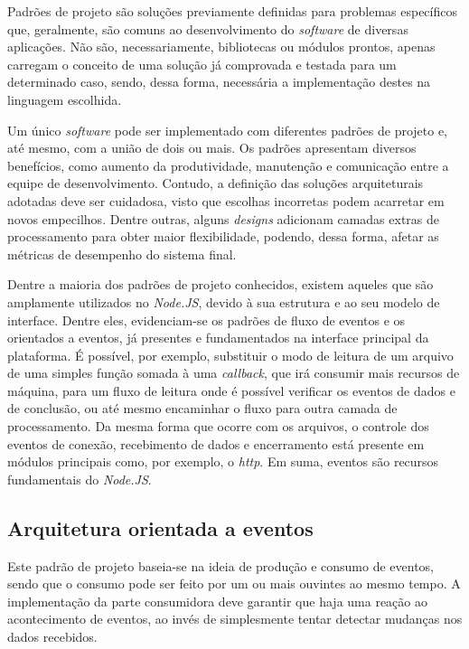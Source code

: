 \documentclass[12pt]{article}
\begin{document}
Padrões de projeto são soluções previamente definidas para problemas específicos que, geralmente,
são comuns ao desenvolvimento do \textit{software} de diversas aplicações. Não são, necessariamente, 
bibliotecas ou módulos prontos, apenas carregam o conceito de uma solução já comprovada e testada para um 
determinado caso, sendo, dessa forma, necessária a implementação destes na 
linguagem escolhida. \cite[p. 13]{DIOGORESENDE}

Um único \textit{software} pode ser implementado com diferentes padrões de projeto e, até mesmo, com a união
de dois ou mais. Os padrões apresentam diversos benefícios, como aumento da produtividade, manutenção e comunicação
entre a equipe de desenvolvimento. Contudo, a definição das soluções arquiteturais adotadas deve ser 
cuidadosa, visto que escolhas incorretas podem acarretar em novos empecilhos. Dentre outras, 
alguns \textit{designs} adicionam camadas extras de processamento para obter maior flexibilidade, podendo, dessa forma, 
afetar as métricas de desempenho do sistema final. \cite[p. 13 - p. 14]{DIOGORESENDE}

Dentre a maioria dos padrões de projeto conhecidos, existem aqueles que são amplamente utilizados no 
\textit{Node.JS}, devido à sua estrutura e ao seu modelo de interface. Dentre eles, evidenciam-se
os padrões de fluxo de eventos e os orientados a eventos, já presentes e fundamentados na interface principal 
da plataforma. É possível, por exemplo, substituir o modo de leitura de um arquivo de 
uma simples função somada à uma \textit{callback}, que irá consumir mais recursos de máquina, para um fluxo de 
leitura onde é possível verificar os eventos de dados e de conclusão, ou até mesmo encaminhar o fluxo para 
outra camada de processamento. Da mesma forma que ocorre com os arquivos, o controle dos eventos 
de conexão, recebimento de dados e encerramento está presente em módulos principais como, por exemplo, 
o \textit{http}. Em suma, eventos são recursos fundamentais do \textit{Node.JS}. \cite[p. 15]{DIOGORESENDE}


\subsection{Arquitetura orientada a eventos}

Este padrão de projeto baseia-se na ideia de produção e consumo de eventos, sendo que o consumo pode ser feito por um
ou mais ouvintes ao mesmo tempo. A implementação da parte consumidora deve garantir que haja uma reação ao 
acontecimento de eventos, ao invés de simplesmente tentar detectar mudanças nos dados recebidos. \cite[p. 27]{DIOGORESENDE}
\end{document}
